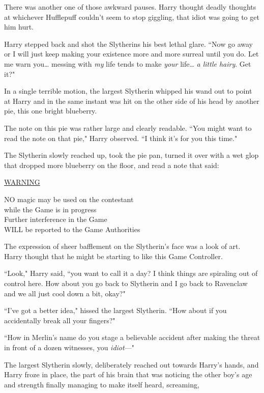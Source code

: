 There was another one of those awkward pauses. Harry thought deadly thoughts at whichever Hufflepuff couldn't seem to stop giggling, that idiot was going to get him hurt.

Harry stepped back and shot the Slytherins his best lethal glare. ``Now go away or I will just keep making your existence more and more surreal until you do. Let me warn you{\ldots} messing with \emph{my} life tends to make \emph{your} life{\ldots} \emph{a little hairy}. Get it?"

In a single terrible motion, the largest Slytherin whipped his wand out to point at Harry and in the same instant was hit on the other side of his head by another pie, this one bright blueberry.

The note on this pie was rather large and clearly readable. ``You might want to read the note on that pie," Harry observed. ``I think it's for you this time."

The Slytherin slowly reached up, took the pie pan, turned it over with a wet glop that dropped more blueberry on the floor, and read a note that said:
\begin{writtenNote}
\MakeUppercase{\underline{Warning}}

\MakeUppercase{No} magic may be used on the contestant\\
while the Game is in progress\\
Further interference in the Game\\
\MakeUppercase{will} be reported to the Game Authorities
\end{writtenNote}

The expression of sheer bafflement on the Slytherin's face was a look of art. Harry thought that he might be starting to like this Game Controller.

``Look," Harry said, ``you want to call it a day? I think things are spiraling out of control here. How about you go back to Slytherin and I go back to Ravenclaw and we all just cool down a bit, okay?"

``I've got a better idea," hissed the largest Slytherin. ``How about if you accidentally break all your fingers?"

``How in Merlin's name do you stage a believable accident after making the threat in front of a dozen witnesses, you \emph{idiot}—"

The largest Slytherin slowly, deliberately reached out towards Harry's hands, and Harry froze in place, the part of his brain that was noticing the other boy's age and strength finally managing to make itself heard, screaming, 

